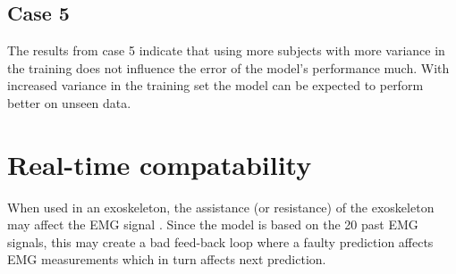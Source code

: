 \documentclass[../main.tex]{subfiles}
\begin{document}
\subsection{Case 5}
\label{sec:discussion-case5}
The results from case 5 indicate that using more subjects with more variance in the training does not influence the error of the model's performance much.
With increased variance in the training set the model can be expected to perform better on unseen data.

\section{Real-time compatability}
\label{sec:discussion_real-time}
When used in an exoskeleton, the assistance (or resistance) of the exoskeleton may affect the \ac{EMG} signal \cite{Androwis2018}.
Since the model is based on the 20 past \ac{EMG} signals, this may create a bad feed-back loop where a faulty prediction affects \ac{EMG} measurements which in turn affects next prediction.
\end{document}
